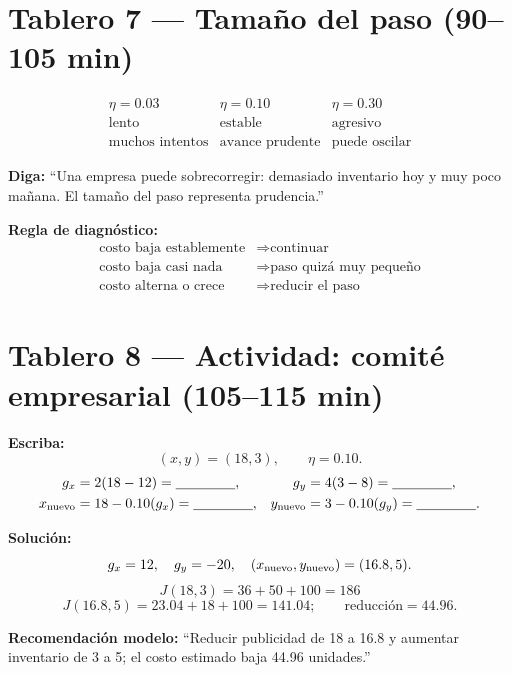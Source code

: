 \documentclass[11pt]{article}
\begin{document}
\section*{Tablero 7 --- Tamaño del paso (90--105 min)}
\[
\begin{array}{c|c|c}
\eta=0.03&\eta=0.10&\eta=0.30\\
\text{lento}&\text{estable}&\text{agresivo}\\
\text{muchos intentos}&\text{avance prudente}&\text{puede oscilar}
\end{array}
\]

\textbf{Diga:} ``Una empresa puede sobrecorregir: demasiado inventario hoy y muy
poco mañana. El tamaño del paso representa prudencia.''

\textbf{Regla de diagnóstico:}
\[
\begin{array}{ll}
\text{costo baja establemente}&\Rightarrow\text{continuar}\\
\text{costo baja casi nada}&\Rightarrow\text{paso quizá muy pequeño}\\
\text{costo alterna o crece}&\Rightarrow\text{reducir el paso}
\end{array}
\]

\newpage
\section*{Tablero 8 --- Actividad: comité empresarial (105--115 min)}
\textbf{Escriba:}
\[
(x,y)=(18,3),\qquad \eta=0.10.
\]
\[
\begin{aligned}
g_x&=2(18-12)=\underline{\hspace{1.5cm}},&
g_y&=4(3-8)=\underline{\hspace{1.5cm}},\\
x_{\rm nuevo}&=18-0.10(g_x)=\underline{\hspace{1.5cm}},&
y_{\rm nuevo}&=3-0.10(g_y)=\underline{\hspace{1.5cm}}.
\end{aligned}
\]

\textbf{Solución:}
\[
g_x=12,\quad g_y=-20,\quad
(x_{\rm nuevo},y_{\rm nuevo})=(16.8,5).
\]
\[
J(18,3)=36+50+100=\boxed{186}
\]
\[
J(16.8,5)=23.04+18+100=\boxed{141.04};
\qquad\boxed{\text{reducción}=44.96}.
\]

\textbf{Recomendación modelo:} ``Reducir publicidad de 18 a 16.8 y aumentar
inventario de 3 a 5; el costo estimado baja 44.96 unidades.''
\end{document}
